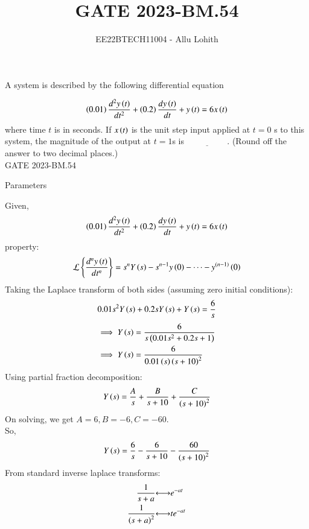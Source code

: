 \documentclass[journal,12pt,twocolumn]{IEEEtran}
\theoremstyle{remark}
\begin{document}

\vspace{3cm}

\title{GATE 2023-BM.54}
\author{EE22BTECH11004 - Allu Lohith}

\maketitle

    A system is described by the following differential equation
    
    $$\left(0.01\right) \frac{d^2y\left(t\right)}{dt^2} + \left(0.2\right)\frac{dy\left(t\right) }{dt} + y\left(t\right) = 6x\left(t\right)$$
    where time $t$ is in seconds. If $x\left(t\right)$ is the unit step input applied at $t = 0$ s to this system, the magnitude of the output at $t = 1$s is $\underline{\hspace{2cm}}$. (Round off the answer to two decimal places.)\\

    \hfill {GATE 2023-BM.54}
    
\solution
\begin{table}[h!]
\centering

\vspace{0.5cm}
\caption{\normalsize Parameters}
\end{table}
    Given,
    \begin{align}
         \left(0.01\right) \frac{d^2y\left(t\right)}{dt^2} + \left(0.2\right)\frac{dy\left(t\right) }{dt} + y\left(t\right) = 6x\left(t\right)
    \end{align}
    property:
    \begin{align}
        \mathcal{L}\left\{\frac{d^n y\left(t\right)}{dt^n}\right\} = s^n Y\left(s\right) - s^{n-1} y\left(0\right) - \dots - y^{\left(n-1\right)}\left(0\right)
    \end{align}
    Taking the Laplace transform of both sides (assuming zero initial conditions):
   \begin{align}
        0.01s^2Y\left(s\right) + 0.2sY\left(s\right) + Y\left(s\right) = \frac{6}{s}
    \end{align}
    \begin{align}
        \implies Y\left(s\right) &= \frac{6}{s\left(0.01s^2 + 0.2s + 1\right)}\\
        \implies Y\left(s\right) &= \frac{6}{ 0.01\left(s\right) \left(s + 10\right)^2}
    \end{align}
    Using partial fraction decomposition:
    \begin{align}
    Y\left(s\right) = \frac{A}{s} + \frac{B}{s + 10} + \frac{C}{\left(s + 10\right)^2}
    \end{align}
    On solving, we get $A=6,B=-6,C=-60$.\\
    So,\begin{align}
        Y\left(s\right) = \frac{6}{s} - \frac{6}{s + 10} - \frac{60}{\left(s + 10\right)^2}
    \end{align}
    From standard inverse laplace transforms:
    \begin{align}
	    \frac{1}{s+a}   &{\longleftrightarrow}    e^{-at}\\
	    \frac{1}{\left(s+a\right)^2}  &{\longleftrightarrow }  te^{-at}
    \end{align}	    
	    
\end{document}
